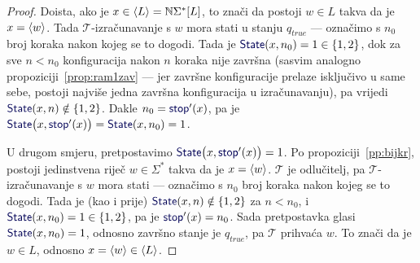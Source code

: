 \begin{proof}
Doista, ako je $x\in\langle L\rangle={\mathbb N}\Sigma^*[L]$, to znači da postoji $w\in L$ takva da je $x=\langle w\rangle$. Tada $\mathcal T$-izračunavanje s $w$ mora stati u stanju $q_\mathit{true}$ --- označimo s $n_0$ broj koraka nakon kojeg se to dogodi. Tada je $\f{State}(x,n_0)=1\in\{1,2\}$, dok za sve $n<n_0$ konfiguracija nakon $n$ koraka nije završna (sasvim analogno propoziciji~\ref{prop:ram1zav} --- jer završne konfiguracije prelaze isključivo u same sebe, postoji najviše jedna završna konfiguracija u izračunavanju), pa vrijedi $\f{State}(x,n)\notin\{1,2\}$. Dakle $n_0=\f{stop}'(x)$, pa je $\f{State}\bigl(x,\f{stop}'(x)\bigr)=\f{State}(x,n_0)=1$.

U drugom smjeru, pretpostavimo $\f{State}\bigl(x,\f{stop}'(x)\bigr)=1$. Po propoziciji~\ref{pp:bijkr}, postoji jedinstvena riječ $w\in\Sigma^*$ takva da je $x=\langle w\rangle$. $\mathcal T$ je odlučitelj, pa $\mathcal T$-izračunavanje s $w$ mora stati --- označimo s $n_0$ broj koraka nakon kojeg se to dogodi. Tada je (kao i prije) $\f{State}(x,n)\notin\{1,2\}$ za $n<n_0$, i $\f{State}(x,n_0)=1\in\{1,2\}$, pa je $\f{stop}'(x)=n_0$. Sada pretpostavka glasi $\f{State}(x,n_0)=1$, odnosno završno stanje je $q_{\mathit{true}}$, pa $\mathcal T$ prihvaća $w$. To znači da je $w\in L$, odnosno $x=\langle w\rangle\in\langle L\rangle$.
\end{proof}

